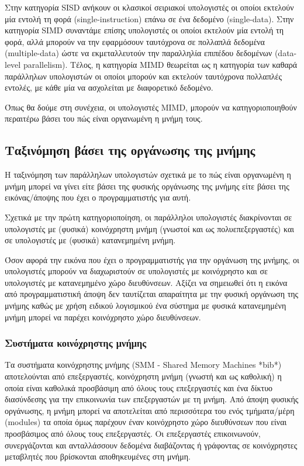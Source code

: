 Στην κατηγορία SISD ανήκουν οι κλασικοί σειριακοί υπολογιστές οι οποίοι εκτελούν μία εντολή τη φορά (single-instruction) επάνω σε ένα δεδομένο (single-data). Στην κατηγορία SIMD συναντάμε επίσης υπολογιστές οι οποίοι εκτελούν μία εντολή τη φορά, αλλά μπορούν να την εφαρμόσουν ταυτόχρονα σε πολλαπλά δεδομένα (multiple-data) ώστε να εκμεταλλευτούν την παραλληλία επιπέδου δεδομένων (data-level parallelism). Τέλος, η κατηγορία MIMD θεωρείται ως η κατηγορία των καθαρά παράλληλων υπολογιστών οι οποίοι μπορούν και εκτελούν ταυτόχρονα πολλαπλές εντολές, με κάθε μία να ασχολείται με διαφορετικό δεδομένο.

Όπως θα δούμε στη συνέχεια, οι υπολογιστές MIMD, μπορούν να κατηγοριοποιηθούν περαιτέρω βάσει του πώς είναι οργανωμένη η μνήμη τους.

\subsection{Ταξινόμηση βάσει της οργάνωσης της μνήμης}
Η ταξινόμηση των παράλληλων υπολογιστών σχετικά με το πώς είναι οργανωμένη η μνήμη μπορεί να γίνει είτε βάσει της φυσικής οργάνωσης της μνήμης είτε βάσει της εικόνας/άποψης που έχει ο προγραμματιστής για αυτή.

Σχετικά με την πρώτη κατηγοριοποίηση, οι παράλληλοι υπολογιστές διακρίνονται σε υπολογιστές με (φυσικά) κοινόχρηστη μνήμη (γνωστοί και ως πολυεπεξεργαστές) και σε υπολογιστές με (φυσικά) κατανεμημένη μνήμη.

Όσον αφορά την εικόνα που έχει ο προγραμματιστής για την οργάνωση της μνήμης, οι υπολογιστές μπορούν να διαχωριστούν σε υπολογιστές με κοινόχρηστο και σε υπολογιστές με κατανεμημένο χώρο διευθύνσεων. Αξίζει να σημειωθεί ότι η εικόνα από προγραμματιστική άποψη δεν ταυτίζεται απαραίτητα με την φυσική οργάνωση της μνήμης καθώς με χρήση ειδικού λογισμικού ένα σύστημα με φυσικά κατανεμημένη μνήμη μπορεί να παρέχει κοινόχρηστο χώρο διευθύνσεων.


\subsubsection{Συστήματα κοινόχρηστης μνήμης}
Τα συστήματα κοινόχρηστης μνήμης (SMM - Shared Memory Machines *bib*) αποτελούνται από επεξεργαστές, κοινόχρηστη μνήμη (γνωστή και ως καθολική) η οποία είναι καθολικά προσβάσιμη από όλους τους επεξεργαστές και ένα δίκτυο διασύνδεσης για την επικοινωνία των επεξεργαστών με τη μνήμη. Από άποψη φυσικής οργάνωσης, η μνήμη μπορεί να αποτελείται από περισσότερα του ενός τμήματα/μέρη (modules) τα οποία όμως παρέχουν έναν κοινόχρηστο χώρο διευθύνσεων που είναι προσβάσιμος από όλους τους επεξεργαστές. Οι επεξεργαστές επικοινωνούν, συνεργάζονται και ανταλλάσσουν δεδομένα διαβάζοντας ή γράφοντας σε κοινόχρηστες μεταβλητές που βρίσκονται αποθηκευμένες στη μνήμη.

